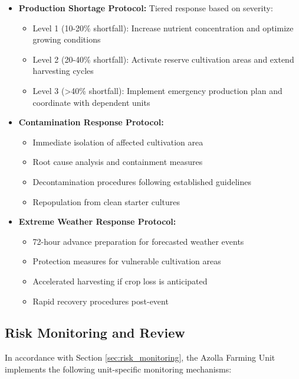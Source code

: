 \begin{itemize}
    \item \textbf{Production Shortage Protocol:} Tiered response based on severity:
    \begin{itemize}
        \item Level 1 (10-20\% shortfall): Increase nutrient concentration and optimize growing conditions
        \item Level 2 (20-40\% shortfall): Activate reserve cultivation areas and extend harvesting cycles
        \item Level 3 (>40\% shortfall): Implement emergency production plan and coordinate with dependent units
    \end{itemize}
    
    \item \textbf{Contamination Response Protocol:}
    \begin{itemize}
        \item Immediate isolation of affected cultivation area
        \item Root cause analysis and containment measures
        \item Decontamination procedures following established guidelines
        \item Repopulation from clean starter cultures
    \end{itemize}
    
    \item \textbf{Extreme Weather Response Protocol:}
    \begin{itemize}
        \item 72-hour advance preparation for forecasted weather events
        \item Protection measures for vulnerable cultivation areas
        \item Accelerated harvesting if crop loss is anticipated
        \item Rapid recovery procedures post-event
    \end{itemize}
\end{itemize}

\subsection{Risk Monitoring and Review}

In accordance with Section \ref{sec:risk_monitoring}, the Azolla Farming Unit implements the following unit-specific monitoring mechanisms:

